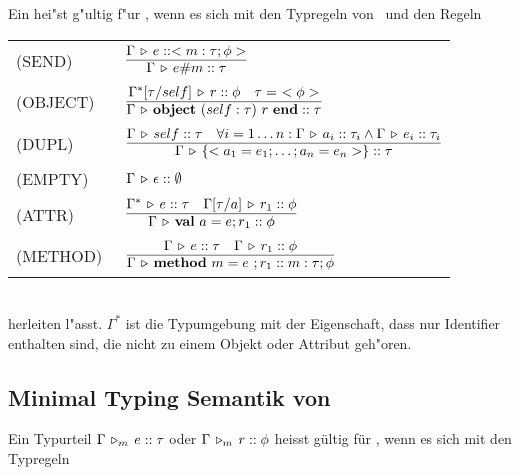 Ein  hei"st g"ultig f"ur \LTWOO, wenn es sich mit den Typregeln von \LTWO\ und den Regeln\\[3mm]
\begin{tabular}{ll}
  \mbox{(SEND)\   } & $\regel{\Tj{\Gamma}{e}{<m:\tau;\phi>}}
                           {\Tj{\Gamma}{\send{e}{m}}{\tau}}$\\[5mm]
  \mbox{(OBJECT)\ } & $\regel{\Tj{\Gamma^*[\tau/self]}{r}{\phi}
                             \quad \tau =\ \objecttype{\phi}}
                             {\Tj{\Gamma}{\object{self:\tau}{r}}{\tau}}$\\[5mm]
  \mbox{(DUPL)\   } & $\regel{\Tj{\Gamma}{self}{\tau}
                              \quad \forall i = 1 \ldots n :
                              \Tj{\Gamma}{a_i}{\tau_i} \wedge
                              \Tj{\Gamma}{e_i}{\tau_i}}
                             {\Tj{\Gamma}{\{< a_1 = e_1;\ldots;a_n = e_n >\}}{\tau}}$\\[5mm]
  \mbox{(EMPTY)\  } & $\Gamma \, \triangleright \, \epsilon\mathrel{::}\emptyset$\\[5mm]
  \mbox{(ATTR)\   } & $\regel{\Tj{\Gamma^*}{e}{\tau}
                              \quad \Tj{\Gamma[\tau/a]}{r_1}{\phi}}
                             {\Tj{\Gamma}{\attr{a}{e}r_1}{\phi}}$ \\[5mm]
  \mbox{(METHOD)\ } & $\regel{\Tj{\Gamma}{e}{\tau}
                              \quad \Tj{\Gamma}{r_1}{\phi}}
                             {\Tj{\Gamma}{\method{m}{e}r_1}{m:\tau;\phi}}$
\end{tabular}\\[7mm]
herleiten l"asst. $\Gamma^*$ ist die Typumgebung mit der Eigenschaft, dass nur Identifier enthalten sind,
die nicht zu einem Objekt oder Attribut geh"oren.

\subsection{Minimal Typing Semantik von \LTWOO}

  Ein Typurteil $\Gamma\,\triangleright_m\,e\mathrel{::}\tau$ oder $\Gamma\,\triangleright_m\,r\mathrel{::}\phi$ heisst g\"ultig f\"ur \Lom,
  wenn es sich mit den  Typregeln \\[5mm]

